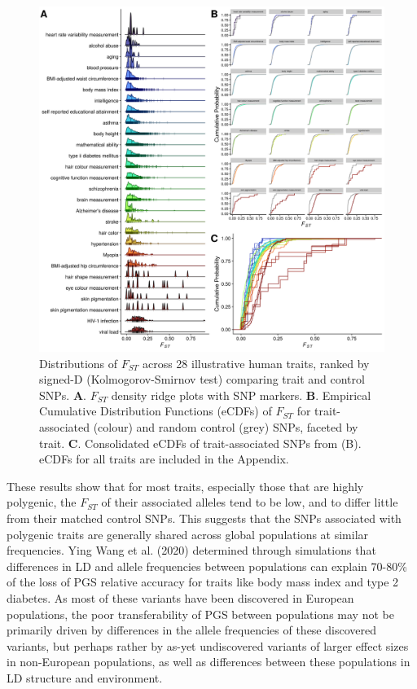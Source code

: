 \documentclass[
]{book}
\begin{document}
\begin{figure}
\includegraphics[width=1\linewidth]{figs/fst/0.1_1000_20220314_final} \caption{Distributions of \(F_{ST}\) across 28 illustrative human traits, ranked by signed-D (Kolmogorov-Smirnov test) comparing trait and control SNPs. \textbf{A}. \(F_{ST}\) density ridge plots with SNP markers. \textbf{B}. Empirical Cumulative Distribution Functions (eCDFs) of \(F_{ST}\) for trait-associated (colour) and random control (grey) SNPs, faceted by trait. \textbf{C}. Consolidated eCDFs of trait-associated SNPs from (B). eCDFs for all traits are included in the Appendix.}\label{fig:FstMain}
\end{figure}

These results show that for most traits, especially those that are highly polygenic, the \(F_{ST}\) of their associated alleles tend to be low, and to differ little from their matched control SNPs. This suggests that the SNPs associated with polygenic traits are generally shared across global populations at similar frequencies. Ying Wang et al. (2020) determined through simulations that differences in LD and allele frequencies between populations can explain 70-80\% of the loss of PGS relative accuracy for traits like body mass index and type 2 diabetes. As most of these variants have been discovered in European populations, the poor transferability of PGS between populations may not be primarily driven by differences in the allele frequencies of these discovered variants, but perhaps rather by as-yet undiscovered variants of larger effect sizes in non-European populations, as well as differences between these populations in LD structure and environment.
\end{document}
